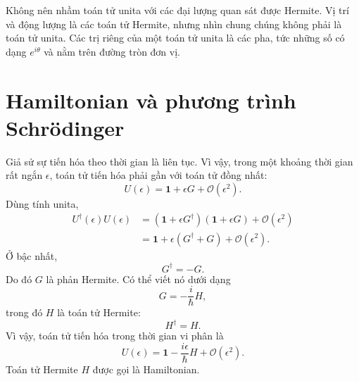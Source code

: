 Không nên nhầm toán tử unita với các đại lượng quan sát được Hermite. Vị trí và động lượng là các toán tử Hermite, nhưng nhìn chung chúng không phải là toán tử unita. Các trị riêng của một toán tử unita là các pha, tức những số có dạng \(e^{i\theta}\) và nằm trên đường tròn đơn vị.

\begin{classroomqa}
\end{classroomqa}

\section{Hamiltonian và phương trình Schr\"odinger}

Giả sử sự tiến hóa theo thời gian là liên tục. Vì vậy, trong một khoảng thời gian rất ngắn \(\epsilon\), toán tử tiến hóa phải gần với toán tử đồng nhất:
\begin{equation}
U(\epsilon)=\mathbf 1+\epsilon G+\mathcal O(\epsilon^2).
\end{equation}
Dùng tính unita,
\begin{align}
U^\dagger(\epsilon)U(\epsilon)
&=
\left(\mathbf 1+\epsilon G^\dagger\right)
\left(\mathbf 1+\epsilon G\right)
+\mathcal O(\epsilon^2)
\\
&=
\mathbf 1+\epsilon(G^\dagger+G)
+\mathcal O(\epsilon^2).
\end{align}
Ở bậc nhất,
\begin{equation}
G^\dagger=-G.
\end{equation}
Do đó \(G\) là phản Hermite. Có thể viết nó dưới dạng
\begin{equation}
G=-\frac{i}{\hbar}H,
\end{equation}
trong đó \(H\) là toán tử Hermite:
\begin{equation}
H^\dagger=H.
\end{equation}
Vì vậy, toán tử tiến hóa trong thời gian vi phân là
\begin{equation}
U(\epsilon)
=
\mathbf 1-\frac{i\epsilon}{\hbar}H
+\mathcal O(\epsilon^2).
\end{equation}
Toán tử Hermite \(H\) được gọi là Hamiltonian.

\begin{classroomqa}
\end{classroomqa}

